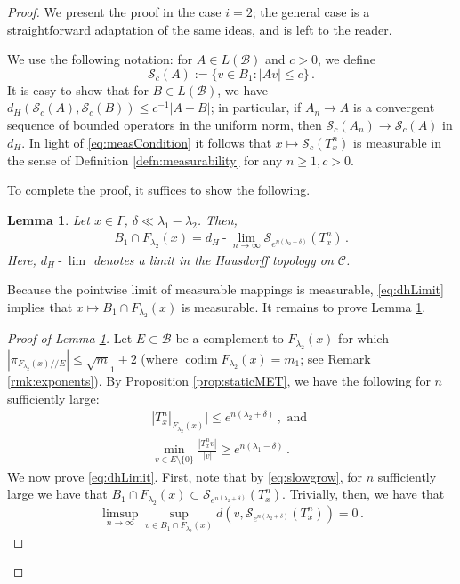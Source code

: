 \documentclass[11pt]{amsart}
\theoremstyle{theorem}
\newtheorem{lem}[thm]{Lemma}
\theoremstyle{definition}
\numberwithin{equation}{section}
\renewcommand{\d}{\delta}
\renewcommand{\l}{\lambda}
\newcommand{\Bc}{\mathcal{B}}
\newcommand{\ds}{/ \! /}
\newcommand{\Sc}{\mathcal{S}}
\newcommand{\codim}{\operatorname{codim}}
\begin{document}
\begin{proof}
We present the proof in the case $i = 2$; the general case is a straightforward adaptation of the same 
ideas, and is left to the reader.

\medskip

We use the following notation: for $A \in L(\Bc)$ and $c > 0$, we define
\[
\Sc_c(A) := \{ v \in B_1 : |A v| \leq c \} \, .
\]
It is easy to show that for $B \in L(\Bc)$, we have $d_H(\Sc_c(A), \Sc_c(B)) \leq c^{-1} |A - B|$; in particular, if $A_n \to A$ is a convergent sequence of bounded operators in the uniform norm, then $\Sc_c(A_n) \to \Sc_c(A)$ in $d_H$. In light of \eqref{eq:measCondition} it follows that $x \mapsto \Sc_c(T^n_x)$ is measurable in the sense of Definition \ref{defn:measurability} for any $n \geq 1, c > 0$.

To complete the proof, it suffices to show the following.
\begin{lem}\label{lem:sectionConverge}
Let $x \in \Gamma$, $\d \ll \l_1 - \l_2$. Then,
\begin{align}\label{eq:dhLimit}
B_1 \cap F_{\l_2}(x) =  d_H \operatorname{-} \lim_{n \to \infty} \Sc_{e^{n (\l_2 + \d)}}(T^n_x) \, .
\end{align}
Here, $d_H \operatorname{-} \lim$ denotes a limit in the Hausdorff topology on $\mathscr C$.
\end{lem}
\noindent Because the pointwise limit of measurable mappings is measurable, \eqref{eq:dhLimit} implies that $x \mapsto B_1 \cap F_{\l_2}(x)$ is measurable. It remains to prove Lemma \ref{lem:sectionConverge}. \qedhere

\begin{proof}[Proof of Lemma \ref{lem:sectionConverge}] 
Let $E \subset \Bc$ be a complement to $F_{\l_2}(x)$ for which $|\pi_{ F_{\l_2}(x) \ds E}| \leq \sqrt m_1 + 2$ (where $\codim F_{\l_2}(x) = m_1$; see Remark \ref{rmk:exponents}). By Proposition \ref{prop:staticMET}, we have the following for $n$ sufficiently large:
\begin{gather}
\label{eq:slowgrow} |T^n_x|_{F_{\l_2}(x)}| \leq e^{n (\l_2 + \d)} \, , \text{ and } \\
\label{eq:fastgrow} \min_{v \in E \setminus \{0\}} \frac{|T^n_x v|}{|v|} \geq e^{n (\l_1 - \d)} \, .
\end{gather}
We now prove \eqref{eq:dhLimit}. First, note that by \eqref{eq:slowgrow}, for $n$ sufficiently large we have that $B_1 \cap F_{\l_2}(x) \subset \Sc_{e^{n(\l_2  + \d)}}(T^n_x)$. Trivially, then, we have that
\[
\limsup_{n \to \infty} \sup_{v \in B_1 \cap F_{\l_2}(x)} d(v, \Sc_{e^{n(\l_2  + \d)}}(T^n_x)) = 0 \, .
\]


\end{proof}
\end{proof}
\end{document}
